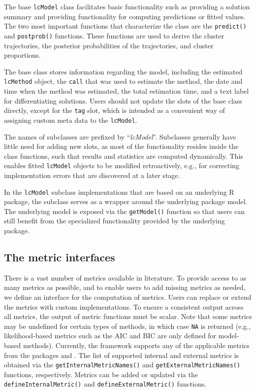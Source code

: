 The base \texttt{lcModel} class facilitates basic functionality such as providing a solution summary and providing functionality for computing predictions or fitted values. The two most important functions that characterize the class are the \texttt{predict()} and \texttt{postprob()} functions. These functions are used to derive the cluster trajectories, the posterior probabilities of the trajectories, and cluster proportions.

The base class stores information regarding the model, including the estimated \texttt{lcMethod} object, the \texttt{call} that was used to estimate the method, the date and time when the method was estimated, the total estimation time, and a text label for differentiating solutions. Users should not update the slots of the base class directly, except for the \texttt{tag} slot, which is intended as a convenient way of assigning custom meta data to the \texttt{lcModel}.

The names of subclasses are prefixed by ``\emph{lcModel}''. Subclasses generally have little need for adding new slots, as most of the functionality resides inside the class functions, such that results and statistics are computed dynamically. This enables fitted \texttt{lcModel} objects to be modified retroactively, e.g., for correcting implementation errors that are discovered at a later stage.

In the \texttt{lcModel} subclass implementations that are based on an underlying R package, the subclass serves as a wrapper around the underlying package model. The underlying model is exposed via the \texttt{getModel()} function so that users can still benefit from the specialized functionality provided by the underlying package.

\subsection{The metric interfaces}\label{subsec:metric}

There is a vast number of metrics available in literature. To provide access to as many metrics as possible, and to enable users to add missing metrics as needed, we define an interface for the computation of metrics. Users can replace or extend the metrics with custom implementations. To ensure a consistent output across all metrics, the output of metric functions must be scalar. Note that some metrics may be undefined for certain types of methods, in which case \texttt{NA} is returned (e.g., likelihood-based metrics such as the AIC and BIC are only defined for model-based methods). Currently, the framework supports any of the applicable metrics from the packages  \citep{Desgraupes2018clusterCrit} and  \citep{You2018mclustcomp}. The list of supported internal and external metrics is obtained via the \texttt{getInternalMetricNames()} and \texttt{getExternalMetricNames()} functions, respectively. Metrics can be added or updated via the \texttt{defineInternalMetric()} and \texttt{defineExternalMetric()} functions.

